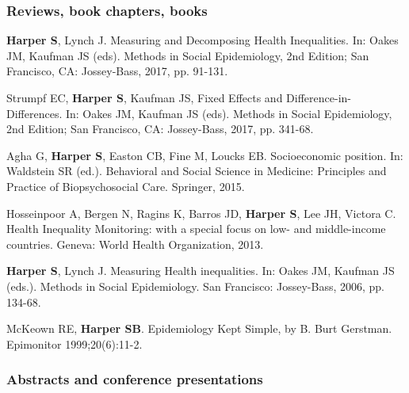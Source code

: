 \documentclass[
  letterpaper,
  DIV=11,
  numbers=noendperiod]{scrartcl}
\begin{document}
\hypertarget{reviews-book-chapters-books}{%
\subsubsection{Reviews, book chapters,
books}\label{reviews-book-chapters-books}}

\begin{etaremune}

\item \textbf{Harper S}, Lynch J. Measuring and Decomposing Health Inequalities. In: Oakes JM, Kaufman JS (eds).  Methods in Social Epidemiology, 2nd Edition; San Francisco, CA: Jossey-Bass, 2017, pp. 91-131.

\item Strumpf EC, \textbf{Harper S}, Kaufman JS, Fixed Effects and Difference-in-Differences. In: Oakes JM, Kaufman JS (eds).  Methods in Social Epidemiology, 2nd Edition; San Francisco, CA: Jossey-Bass, 2017, pp. 341-68.

\item   Agha G, \textbf{Harper S}, Easton CB, Fine M, Loucks EB. Socioeconomic position. In: Waldstein SR (ed.). Behavioral and Social Science in Medicine: Principles and Practice of Biopsychosocial Care. Springer, 2015.

\item Hosseinpoor A, Bergen N, Ragins K, Barros JD, \textbf{Harper S}, Lee JH, Victora C. Health Inequality Monitoring: with a special focus on low- and middle-income countries. Geneva: World Health Organization, 2013. 

\item \textbf{Harper S}, Lynch J.  Measuring Health inequalities.  In: Oakes JM, Kaufman JS (eds.).  Methods in Social Epidemiology. San Francisco: Jossey-Bass, 2006, pp. 134-68.

\item McKeown RE, \textbf{Harper SB}.  Epidemiology Kept Simple, by B. Burt Gerstman. Epimonitor 1999;20(6):11-2.

\end{etaremune}

\hypertarget{abstracts-and-conference-presentations}{%
\subsubsection{Abstracts and conference
presentations}\label{abstracts-and-conference-presentations}}
\end{document}
